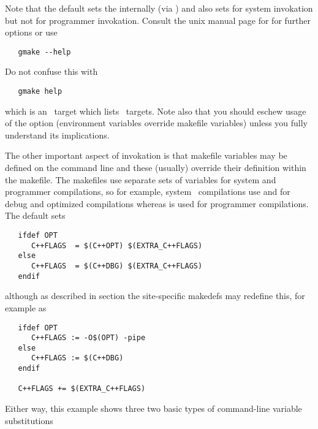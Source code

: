 \noindent
Note that the default  sets the 
internally (via ) and also sets  for system invokation
but not for programmer invokation.  Consult the unix manual page for
 for further options or use

\begin{verbatim}
   gmake --help
\end{verbatim}

\noindent
Do not confuse this with

\begin{verbatim}
   gmake help
\end{verbatim}

\noindent
which is an \aipspp\ target which lists \aipspp\ targets.  Note also that you
should eschew usage of the  option (environment variables override
makefile variables) unless you fully understand its implications.

The other important aspect of  invokation is that makefile
variables may be defined on the command line and these (usually) override
their definition within the makefile.  The makefiles use separate sets of
variables for system and programmer compilations, so for example, system
\cplusplus\ compilations use  and  for debug and
optimized compilations whereas  is used for programmer
compilations.  The default  sets

\begin{verbatim}
   ifdef OPT
      C++FLAGS  = $(C++OPT) $(EXTRA_C++FLAGS)
   else
      C++FLAGS  = $(C++DBG) $(EXTRA_C++FLAGS)
   endif
\end{verbatim}

\noindent
although as described in section 
the site-specific makedefs may redefine this, for example as

\begin{verbatim}
   ifdef OPT
      C++FLAGS := -O$(OPT) -pipe
   else
      C++FLAGS := $(C++DBG)
   endif

   C++FLAGS += $(EXTRA_C++FLAGS)
\end{verbatim}

Either way, this example shows three two basic types of command-line variable
substitutions

